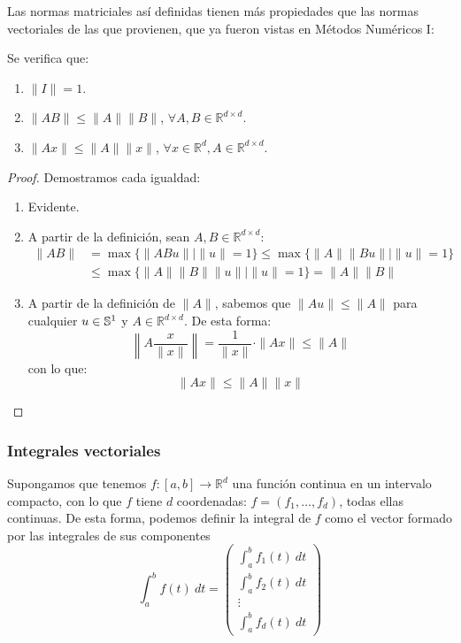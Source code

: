\noindent
Las normas matriciales así definidas tienen más propiedades que las normas vectoriales de las que provienen, que ya fueron vistas en Métodos Numéricos I\@:
\begin{prop}
    Se verifica que:
    \begin{enumerate}
        \item $\|I\| = 1$.
        \item $\|AB\| \leq \|A\|\|B\|$, $\forall A,B\in \mathbb{R}^{d\times d}$.
        \item $\|Ax\| \leq \|A\|\|x\|$, $\forall x\in \mathbb{R}^d, A\in \mathbb{R}^{d\times d}$.
    \end{enumerate}
    \begin{proof}
        Demostramos cada igualdad:
        \begin{enumerate}
            \item Evidente.
            \item A partir de la definición, sean $A,B\in \mathbb{R}^{d\times d}$:
                \begin{align*}
                    \|AB\| &= \max\{\|ABu\| \mid \|u\| = 1\} \leq \max\{\|A\|\|Bu\| \mid \|u\| = 1\} \\
                        &\leq \max\{\|A\|\|B\|\|u\| \mid \|u\| = 1\} = \|A\|\|B\|
                \end{align*}
            \item A partir de la definición de $\|A\|$, sabemos que $\|Au\| \leq \|A\|$ para cualquier $u\in \mathbb{S}^1$ y $A\in \mathbb{R}^{d\times d}$. De esta forma:
                \begin{equation*}
                    \left\|A \dfrac{x}{\|x\|}\right\| = \dfrac{1}{\|x\|} \cdot \|Ax\| \leq \|A\|
                \end{equation*}
                con lo que:
                \begin{equation*}
                    \|Ax\| \leq \|A\|\|x\|
                \end{equation*}
        \end{enumerate}
    \end{proof}
\end{prop}

\subsubsection{Integrales vectoriales}
Supongamos que tenemos $f:[a,b]\rightarrow \mathbb{R}^d$ una función continua en un intervalo compacto, con lo que $f$ tiene $d$ coordenadas: $f=(f_1,\ldots,f_d)$, todas ellas continuas. De esta forma, podemos definir la integral de $f$ como el vector formado por las integrales de sus componentes
\begin{equation*}
    \int_{a}^{b} f(t)~dt  = \left(\begin{array}{c}
        \displaystyle\int_{a}^{b} f_1(t)~dt  \\
        \displaystyle\int_{a}^{b} f_2(t)~dt  \\
        \vdots \\
        \displaystyle\int_{a}^{b} f_d(t)~dt  
    \end{array}\right)
\end{equation*}

